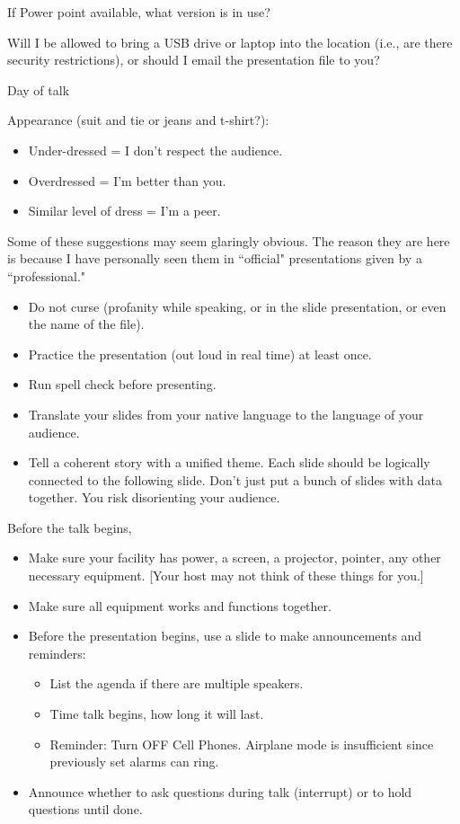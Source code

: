 If Power point available, what version is in use?

Will I be allowed to bring a USB drive or laptop into the location (i.e., are there security restrictions), or should I email the presentation file to you?

Day of talk

Appearance (suit and tie or jeans and t-shirt?):
\begin{itemize}
    \item Under-dressed = I don't respect the audience.
    \item Overdressed = I'm better than you.
    \item Similar level of dress = I'm a peer.
\end{itemize}
Some of these suggestions may seem glaringly obvious. The reason they are here is because I have personally seen them in ``official" presentations given by a ``professional."
\begin{itemize}
    \item Do not curse (profanity while speaking, or in the slide presentation, or even the name of the file).
    \item Practice the presentation (out loud in real time) at least once.
    \item Run spell check before presenting.
    \item Translate your slides from your native language to the language of your audience.
    \item Tell a coherent story with a unified theme. Each slide should be logically connected to the following slide. Don't just put a bunch of slides with data together. You risk disorienting your audience.
\end{itemize}
Before the talk begins,
\begin{itemize}
    \item Make sure your facility has power, a screen, a projector, pointer, any other necessary equipment. [Your host may not think of these things for you.]
    \item Make sure all equipment works and functions together.
    \item Before the presentation begins, use a slide to make announcements and reminders:
\begin{itemize}
    \item List the agenda if there are multiple speakers.
    \item Time talk begins, how long it will last.
    \item Reminder: Turn OFF Cell Phones. Airplane mode is insufficient since previously set alarms can ring.
\end{itemize}
    \item Announce whether to ask questions during talk (interrupt) or to hold questions until done.
\end{itemize}
